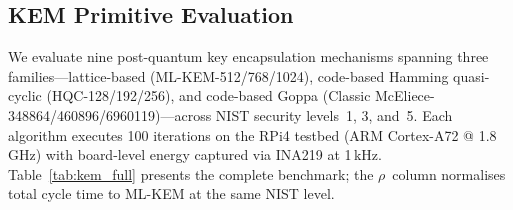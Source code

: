 
\subsection{KEM Primitive Evaluation}\label{sec:kem}

We evaluate nine post-quantum key encapsulation mechanisms spanning
three families---lattice-based (ML-KEM-512/768/1024), code-based
Hamming quasi-cyclic (HQC-128/192/256), and code-based Goppa
(Classic McEliece-348864/460896/6960119)---across NIST security
levels~1, 3, and~5.  Each algorithm executes 100 iterations on the
RPi4 testbed (ARM Cortex-A72 @ \mbox{1.8\,GHz}) with board-level
energy captured via INA219 at \mbox{1\,kHz}.
Table~\ref{tab:kem_full} presents the complete benchmark; the
$\rho$~column normalises total cycle time to ML-KEM at the same
NIST level.

